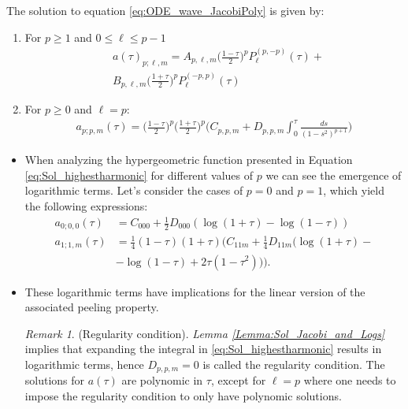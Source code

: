 \documentclass{beamer}
\theoremstyle{remark}
\newtheorem{remark}{Remark}
\theoremstyle{plain}
\theoremstyle{plain}
\begin{document}
\begin{frame}
  \begin{lemma}\label{Lemma:Sol_Jacobi_and_Logs} The solution to equation \eqref{eq:ODE_wave_JacobiPoly} is given
    by:
    \begin{enumerate}
    \item For $p\geq 1$ and $0\leq \ell \leq p-1$
     \begin{align}\label{eq:Sol_jac_poly}
      & a(\tau)_{p;\ell,m} =A_{p,\ell,m}\bigg(\frac{1-\tau}{2}\bigg)^{p}P_{\ell}^{(p,-p)}(\tau) + \nonumber \\
      & B_{p,\ell,m}\bigg(\frac{1+\tau}{2}\bigg)^{p}P_{\ell}^{(-p,p)}(\tau)
     \end{align}
    
    \item For $p\geq 0$ and $\ell=p$:
       \begin{align}\label{eq:Sol_highestharmonic}
        {a}_{p;p,m}(\tau) =\bigg(\frac{1-\tau}{2}\bigg)^{p}\bigg(\frac{1+\tau}{2}\bigg)^{p}\Bigg(C_{p,p,m}+D_{p,p,m}\int_{0}^{\tau} \frac{ds}{(1-s^2)^{p+1}}\Bigg)
       \end{align}
      \end{enumerate}
  \end{lemma}
\end{frame}

\begin{frame}
  \begin{itemize}
    \item When analyzing the hypergeometric function presented in Equation \eqref{eq:Sol_highestharmonic} for different values of $p$ we can see the emergence of logarithmic terms. Let's consider the cases of $p = 0$ and $p = 1$, which yield the following expressions:
    \begin{align}
      {a}_{0;0,0}(\tau) & = C_{000} + \tfrac{1}{2} D_{000} (\log(1 + \tau)- \log(1 - \tau ))\\ 
      {a}_{1;1,m}(\tau) & = \tfrac{1}{4} (1 - \tau )(1 + \tau ) (C_{11m} + \tfrac{1}{4} D_{11m}( \log(1 + \tau ) - \nonumber \\
      & -\log(1 - \tau ) + 2\tau(1-\tau^2))).
    \end{align}
    \item These logarithmic terms have implications for the linear version of the associated peeling property.
    \begin{remark}\label{Remark:logfreeRemark}(Regularity condition).
      \emph{Lemma \ref{Lemma:Sol_Jacobi_and_Logs}} implies that expanding the integral in \eqref{eq:Sol_highestharmonic} results in logarithmic terms, hence $D_{p,p,m} = 0$ is called the regularity condition. The solutions for
      $a(\tau)$ are polynomic in $\tau$, except for $\ell = p$ where one needs to impose the regularity condition to only have polynomic solutions.
    \end{remark}
  \end{itemize}
\end{frame}
\end{document}
